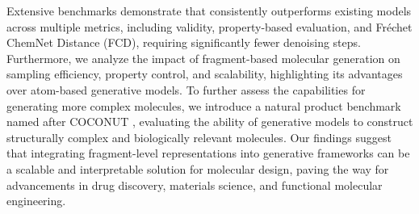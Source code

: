 Extensive benchmarks demonstrate that \methodname{} consistently outperforms existing models across multiple metrics, including validity, property-based evaluation, and Fréchet ChemNet Distance (FCD), requiring significantly fewer denoising steps.
Furthermore, we analyze the impact of fragment-based molecular generation on sampling efficiency, property control, and scalability, highlighting its advantages over atom-based generative models.
To further assess the capabilities for generating more complex molecules, we introduce a natural product benchmark named after COCONUT \citep{coconut, coconut2}, evaluating the ability of generative models to construct structurally complex and biologically relevant molecules.
Our findings suggest that integrating fragment-level representations into generative frameworks can be a scalable and interpretable solution for molecular design, paving the way for advancements in drug discovery, materials science, and functional molecular engineering.